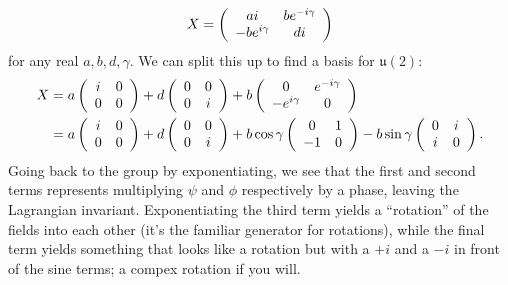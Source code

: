 \documentclass{../mathnotes}
\begin{document}
\begin{align*}
    X=
    \left(
    \begin{array}[]{cc}
        ai & be^{-i\gamma} \\
        -be^{i\gamma} & di
    \end{array}\right)
\end{align*}
for any real $a,b,d,\gamma$. We can split this up to find a basis for $\mathfrak{u}(2)$:
\begin{align*}
    X&=a
    \left( 
    \begin{array}[]{cc}
        i & 0\\
        0 & 0
    \end{array}
    \right)
    +d
    \left( 
    \begin{array}[]{cc}
        0 & 0 \\
        0 & i
    \end{array}
    \right)
    +b
    \left( 
    \begin{array}[]{cc}
        0 & e^{-i\gamma} \\
        -e^{i\gamma} & 0
    \end{array}
    \right)\\
    &=a
    \left( 
    \begin{array}[]{cc}
        i & 0\\
        0 & 0
    \end{array}
    \right)
    +d
    \left( 
    \begin{array}[]{cc}
        0 & 0 \\
        0 & i
    \end{array}
    \right)
    +b\cos\gamma
    \left( 
    \begin{array}[]{cc}
        0 & 1 \\
        -1 & 0
    \end{array}
    \right)
    -b\sin\gamma
    \left( 
    \begin{array}[]{cc}
        0 & i \\
        i & 0
    \end{array}
    \right).
\end{align*}
Going back to the group by exponentiating, we see that the first and second terms represents multiplying $\psi$ and $\phi$
respectively by a phase, leaving the Lagrangian invariant. Exponentiating the third term yields a ``rotation'' of the fields
into each other (it's the familiar generator for rotations), while the final term yields something that looks like a rotation
but with a $+i$ and a $-i$ in front of the sine terms; a compex rotation if you will.
\end{document}
